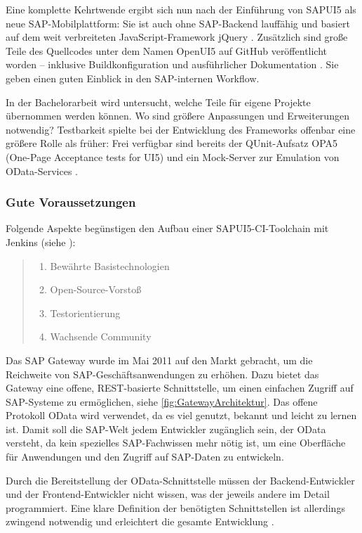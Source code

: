 Eine komplette Kehrtwende ergibt sich nun nach der Einführung von SAPUI5 als
neue SAP-Mobilplattform: Sie ist auch ohne SAP-Backend lauffähig und basiert auf
dem weit verbreiteten JavaScript-Framework jQuery \cite{Antolovic2014}.
Zusätzlich sind große Teile des Quellcodes unter dem Namen OpenUI5 auf GitHub
veröffentlicht worden -- inklusive Buildkonfiguration und ausführlicher
Dokumentation \cite{SAP2014_1}. Sie geben einen guten Einblick in den
SAP-internen Workflow. 

In der Bachelorarbeit wird untersucht, welche Teile für
eigene Projekte übernommen werden können. Wo sind größere Anpassungen und
Erweiterungen notwendig? Testbarkeit spielte bei der Entwicklung des Frameworks offenbar eine größere
Rolle als früher: Frei verfügbar sind bereits der QUnit-Aufsatz OPA5 (One-Page
Acceptance tests for UI5) und ein Mock-Server zur Emulation von OData-Services
\cite{BoennenDreesFischerHeinzStrothmann2014}.

\subsubsection{Gute Voraussetzungen} 
Folgende Aspekte begünstigen den Aufbau einer SAPUI5-CI-Toolchain mit Jenkins (siehe ):
\begin{quote}
	\begin{enumerate}
		\item Bewährte Basistechnologien
		\item Open-Source-Vorstoß
		\item Testorientierung
		\item Wachsende Community
	\end{enumerate}
\end{quote}


\label{sec:neues_backend}
Das SAP Gateway wurde im Mai 2011 auf den Markt gebracht, um die Reichweite von SAP-Geschäftsanwendungen zu erhöhen. 
Dazu bietet das Gateway eine offene, REST-basierte Schnittstelle, um einen einfachen Zugriff auf SAP-Systeme zu ermöglichen, siehe \autoref{fig:GatewayArchitektur}.
Das offene Protokoll OData wird verwendet, da es viel genutzt, bekannt und leicht zu lernen ist. Damit soll die SAP-Welt jedem Entwickler zugänglich sein, der OData versteht, da kein spezielles SAP-Fachwissen mehr nötig ist, um eine Oberfläche für Anwendungen und den Zugriff auf SAP-Daten zu entwickeln.

Durch die Bereitstellung der OData-Schnittstelle müssen der Backend-Entwickler und der Frontend-Entwickler nicht wissen, was der jeweils andere im Detail programmiert. Eine klare Definition der benötigten Schnittstellen ist allerdings zwingend notwendig und erleichtert die gesamte Entwicklung \cite[S.\ 31-45]{BoennenDreesFischerHeinzStrothmann2014}.

